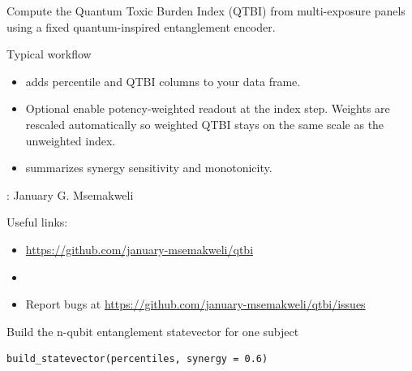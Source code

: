 \documentclass[a4paper]{book}
\begin{document}
%
\begin{Description}
Compute the Quantum Toxic Burden Index (QTBI) from multi-exposure panels
using a fixed quantum-inspired entanglement encoder.
\end{Description}
%
\begin{Section}{Typical workflow}

\begin{itemize}

\item{}  adds percentile and QTBI columns to your data frame.
\item{} Optional  enable potency-weighted readout at the index step.
Weights are rescaled automatically so weighted QTBI stays on the same
\AsIs{\texttt{[0, n]}} scale as the unweighted index.
\item{}  summarizes synergy sensitivity and monotonicity.

\end{itemize}

\end{Section}
%
\begin{Author}
: January G. Msemakweli 

\end{Author}
%
\begin{SeeAlso}
Useful links:
\begin{itemize}

\item{} \url{https://github.com/january-msemakweli/qtbi}
\item{} 
\item{} Report bugs at \url{https://github.com/january-msemakweli/qtbi/issues}

\end{itemize}


\end{SeeAlso}
%
\begin{Description}
Build the n-qubit entanglement statevector for one subject
\end{Description}
%
\begin{Usage}
\begin{verbatim}
build_statevector(percentiles, synergy = 0.6)
\end{verbatim}
\end{Usage}
\end{document}
